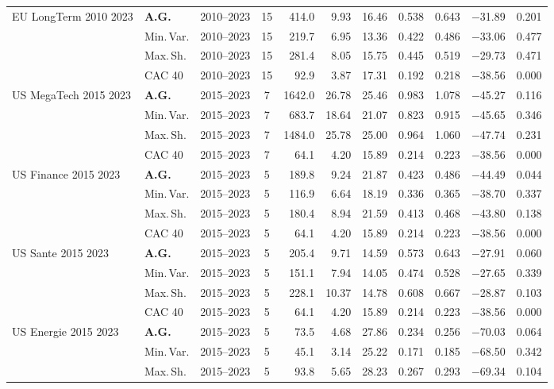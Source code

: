 \begin{longtable}{p{2.6cm} l c c r r r r r r r}
\midrule
EU LongTerm 2010 2023 & \textbf{A.G.} & 2010--2023 & 15 & 414.0 & 9.93 & 16.46 & 0.538 & 0.643 & $-$31.89 & 0.201 \\
 & Min.\,Var. & 2010--2023 & 15 & 219.7 & 6.95 & 13.36 & 0.422 & 0.486 & $-$33.06 & 0.477 \\
 & Max.\,Sh. & 2010--2023 & 15 & 281.4 & 8.05 & 15.75 & 0.445 & 0.519 & $-$29.73 & 0.471 \\
 & CAC 40 & 2010--2023 & 15 & 92.9 & 3.87 & 17.31 & 0.192 & 0.218 & $-$38.56 & 0.000 \\
\midrule
US MegaTech 2015 2023 & \textbf{A.G.} & 2015--2023 & 7 & 1642.0 & 26.78 & 25.46 & 0.983 & 1.078 & $-$45.27 & 0.116 \\
 & Min.\,Var. & 2015--2023 & 7 & 683.7 & 18.64 & 21.07 & 0.823 & 0.915 & $-$45.65 & 0.346 \\
 & Max.\,Sh. & 2015--2023 & 7 & 1484.0 & 25.78 & 25.00 & 0.964 & 1.060 & $-$47.74 & 0.231 \\
 & CAC 40 & 2015--2023 & 7 & 64.1 & 4.20 & 15.89 & 0.214 & 0.223 & $-$38.56 & 0.000 \\
\midrule
US Finance 2015 2023 & \textbf{A.G.} & 2015--2023 & 5 & 189.8 & 9.24 & 21.87 & 0.423 & 0.486 & $-$44.49 & 0.044 \\
 & Min.\,Var. & 2015--2023 & 5 & 116.9 & 6.64 & 18.19 & 0.336 & 0.365 & $-$38.70 & 0.337 \\
 & Max.\,Sh. & 2015--2023 & 5 & 180.4 & 8.94 & 21.59 & 0.413 & 0.468 & $-$43.80 & 0.138 \\
 & CAC 40 & 2015--2023 & 5 & 64.1 & 4.20 & 15.89 & 0.214 & 0.223 & $-$38.56 & 0.000 \\
\midrule
US Sante 2015 2023 & \textbf{A.G.} & 2015--2023 & 5 & 205.4 & 9.71 & 14.59 & 0.573 & 0.643 & $-$27.91 & 0.060 \\
 & Min.\,Var. & 2015--2023 & 5 & 151.1 & 7.94 & 14.05 & 0.474 & 0.528 & $-$27.65 & 0.339 \\
 & Max.\,Sh. & 2015--2023 & 5 & 228.1 & 10.37 & 14.78 & 0.608 & 0.667 & $-$28.87 & 0.103 \\
 & CAC 40 & 2015--2023 & 5 & 64.1 & 4.20 & 15.89 & 0.214 & 0.223 & $-$38.56 & 0.000 \\
\midrule
US Energie 2015 2023 & \textbf{A.G.} & 2015--2023 & 5 & 73.5 & 4.68 & 27.86 & 0.234 & 0.256 & $-$70.03 & 0.064 \\
 & Min.\,Var. & 2015--2023 & 5 & 45.1 & 3.14 & 25.22 & 0.171 & 0.185 & $-$68.50 & 0.342 \\
 & Max.\,Sh. & 2015--2023 & 5 & 93.8 & 5.65 & 28.23 & 0.267 & 0.293 & $-$69.34 & 0.104 \\

\end{longtable}
